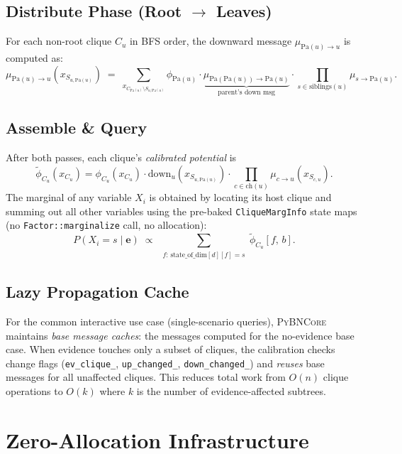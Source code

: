 \documentclass[11pt, letterpaper]{article}
\newcommand{\bncore}{\textsc{PyBNCore}}
\newcommand{\Pa}{\mathrm{Pa}}
\newcommand{\child}{\mathrm{ch}}
\theoremstyle{definitionstyle}
\begin{document}
\subsection{Distribute Phase (Root $\to$ Leaves)}

For each non-root clique $C_u$ in BFS order, the downward message
$\mu_{\Pa(u)\to u}$ is computed as:
\[
  \mu_{\Pa(u)\to u}(x_{S_{u,\Pa(u)}}) \;=\;
  \sum_{x_{C_{\Pa(u)}\setminus S_{u,\Pa(u)}}}
  \phi_{\Pa(u)}\cdot
  \underbrace{\mu_{\Pa(\Pa(u))\to\Pa(u)}}_{\text{parent's down msg}}
  \cdot
  \prod_{s\in\text{siblings}(u)}\mu_{s\to\Pa(u)}.
\]

\subsection{Assemble \& Query}

After both passes, each clique's \emph{calibrated potential} is
\[
  \tilde{\phi}_{C_u}(x_{C_u}) = \phi_{C_u}(x_{C_u})
    \cdot \mathrm{down}_u(x_{S_{u,\Pa(u)}})
    \cdot \prod_{c\in\child(u)} \mu_{c\to u}(x_{S_{c,u}}).
\]
The marginal of any variable $X_i$ is obtained by locating its host
clique and summing out all other variables using the pre-baked
\texttt{CliqueMargInfo} state maps (no \texttt{Factor::marginalize}
call, no allocation):
\[
  P(X_i = s \mid \mathbf{e}) \;\propto\;
  \sum_{\substack{f:\,\text{state\_of\_dim}[d][f]=s}} \tilde{\phi}_{C_u}[f,\,b].
\]

\subsection{Lazy Propagation Cache}

For the common interactive use case (single-scenario queries), \bncore{}
maintains \emph{base message caches}: the messages computed for the
no-evidence base case. When evidence touches only a subset of cliques,
the calibration checks change flags (\texttt{ev\_clique\_},
\texttt{up\_changed\_}, \texttt{down\_changed\_}) and \emph{reuses}
base messages for all unaffected cliques. This reduces total work from
$O(n)$ clique operations to $O(k)$ where $k$ is the number of
evidence-affected subtrees.


\section{Zero-Allocation Infrastructure}
\label{sec:allocator}
\end{document}
